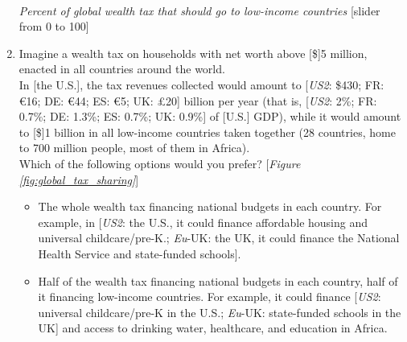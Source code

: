 \documentclass[12pt,english]{article}
\begin{document}
\begin{enumerate}[resume]
  \\ \textit{Percent of global wealth tax that should go to low-income countries} [slider from 0 to 100]
  \item \label{q:global_tax_sharing} Imagine a wealth tax on households with net worth above [\$]5 million, enacted in all countries around the world.  \\
  In [the U.S.], the tax revenues collected would amount to [\textit{US2}: \$430; FR: \euro{}16; DE: \euro{}44; ES: \euro{}5; UK: £20] billion per year (that is, [\textit{US2}: 2\%; FR: 0.7\%; DE: 1.3\%; ES: 0.7\%; UK: 0.9\%] of [U.S.] GDP), while it would amount to [\$]1 billion in all low-income countries taken together (28 countries, home to 700 million people, most of them in Africa).  \\ Which of the following options would you prefer?  [\textit{Figure \ref{fig:global_tax_sharing}}]
  \begin{itemize}
    \item The whole wealth tax financing national budgets in each country. For example, in [\textit{US2}: the U.S., it could finance affordable housing and universal childcare/pre-K.; \textit{Eu}-UK: the UK, it could finance the National Health Service and state-funded schools].
    \item Half of the wealth tax financing national budgets in each country, half of it financing low-income countries. For example, it could finance [\textit{US2}: universal childcare/pre-K in the U.S.; \textit{Eu}-UK: state-funded schools in the UK] and access to drinking water, healthcare, and education in Africa. 
  \end{itemize}
\end{enumerate}
\end{document}
